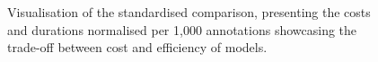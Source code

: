 \begin{figure}[htpb]
  \centering
  \quad 
  \caption[Time Cost Analysis]{Visualisation of the standardised comparison, presenting the costs and durations normalised per 1,000 annotations  showcasing the trade-off between cost and efficiency of models.}\label{fig:gpt-relative-cost}
\end{figure}

